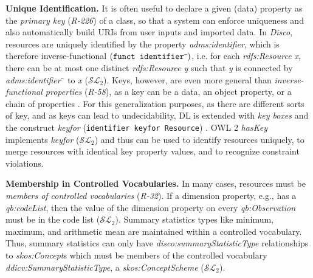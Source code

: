 \documentclass{llncs}
\newcommand{\ms}[1]{\texttt{#1}}
\begin{document}
\textbf{Unique Identification.}
It is often useful to declare a given (data) property as the \emph{primary key} (\emph{R-226}) of a class, so that a system can enforce uniqueness and also automatically build URIs from user inputs and imported data. 
In \emph{Disco}, resources are uniquely identified by the property \emph{adms:identifier},
which is therefore inverse-functional
$(\ms{funct identifier}\sp{\overline{\ }})$,
i.e. for each \emph{rdfs:Resource x}, there can be at most one distinct \emph{rdfs:Resource y} such that \emph{y} is connected by \emph{adms:identifier$\sp{\overline{\ }}$} to \emph{x} ($\mathcal{SL}_{2}$).
Keys, however, are even more general than \emph{inverse-functional properties} (\emph{R-58}),
as a key can be a data, an object property, or a chain of properties \cite{Schneider2009}.
For this generalization purposes, as there are different sorts of key, and as keys can lead to undecidability, 
DL is extended with \emph{key boxes} and the construct \emph{keyfor} (\ms{identifier \ms{keyfor} Resource}) \cite{Lutz2005}.
OWL 2 \emph{hasKey} implements \emph{keyfor} ($\mathcal{SL}_{2}$) and thus can be used to identify resources uniquely, to merge resources with identical key property values, and to recognize constraint violations.

\textbf{Membership in Controlled Vocabularies.}
In many cases, resources must be \emph{members of controlled vocabularies} (\emph{R-32}).
If a dimension property, e.g., has a \emph{qb:codeList},
then the value of the dimension property on every \emph{qb:Observation} must be in the code list ($\mathcal{SL}_{2}$).
Summary statistics types like minimum, maximum, and arithmetic mean are maintained within a controlled vocabulary.  
Thus, summary statistics can only have \emph{disco:summaryStatisticType} relationships to \emph{skos:Concept}s which must be members of the controlled vocabulary \emph{ddicv:SummaryStatisticType}, a \emph{skos:ConceptScheme} ($\mathcal{SL}_{2}$).
\end{document}
